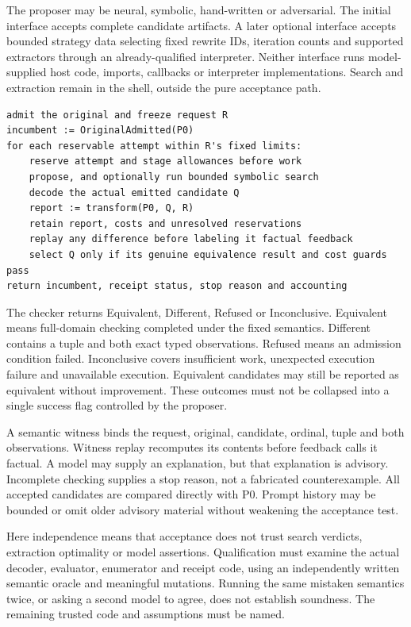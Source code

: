 \documentclass[11pt]{article}
\begin{document}
The proposer may be neural, symbolic, hand-written or adversarial. The initial interface accepts complete candidate artifacts. A later optional interface accepts bounded strategy data selecting fixed rewrite IDs, iteration counts and supported extractors through an already-qualified interpreter. Neither interface runs model-supplied host code, imports, callbacks or interpreter implementations. Search and extraction remain in the shell, outside the pure acceptance path.

\begin{small}
\begin{verbatim}
admit the original and freeze request R
incumbent := OriginalAdmitted(P0)
for each reservable attempt within R's fixed limits:
    reserve attempt and stage allowances before work
    propose, and optionally run bounded symbolic search
    decode the actual emitted candidate Q
    report := transform(P0, Q, R)
    retain report, costs and unresolved reservations
    replay any difference before labeling it factual feedback
    select Q only if its genuine equivalence result and cost guards pass
return incumbent, receipt status, stop reason and accounting
\end{verbatim}
\end{small}

The checker returns Equivalent, Different, Refused or Inconclusive. Equivalent means full-domain checking completed under the fixed semantics. Different contains a tuple and both exact typed observations. Refused means an admission condition failed. Inconclusive covers insufficient work, unexpected execution failure and unavailable execution. Equivalent candidates may still be reported as equivalent without improvement. These outcomes must not be collapsed into a single success flag controlled by the proposer.

A semantic witness binds the request, original, candidate, ordinal, tuple and both observations. Witness replay recomputes its contents before feedback calls it factual. A model may supply an explanation, but that explanation is advisory. Incomplete checking supplies a stop reason, not a fabricated counterexample. All accepted candidates are compared directly with P0. Prompt history may be bounded or omit older advisory material without weakening the acceptance test.

Here independence means that acceptance does not trust search verdicts, extraction optimality or model assertions. Qualification must examine the actual decoder, evaluator, enumerator and receipt code, using an independently written semantic oracle and meaningful mutations. Running the same mistaken semantics twice, or asking a second model to agree, does not establish soundness. The remaining trusted code and assumptions must be named.
\end{document}
